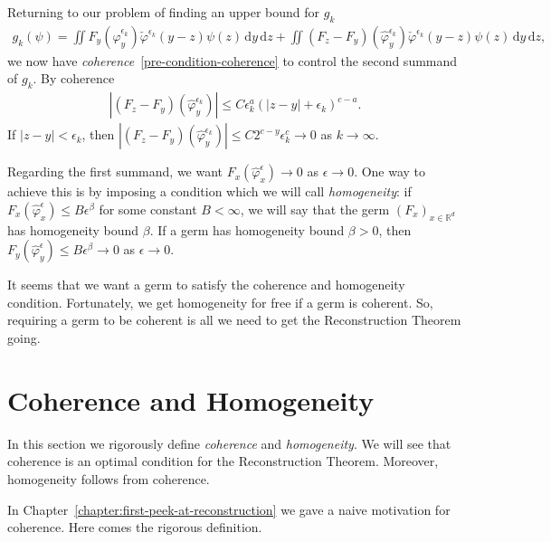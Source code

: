 Returning to our problem of finding an upper bound for \(g_k\)
\begin{align*}
    g_k(\psi) = \iint F_y(\hat \varphi^{\epsilon_k}_y) \check \varphi^{\epsilon_k}(y-z) \psi(z) \, \mathrm{d}y\, \mathrm{d}z 
    + \iint (F_z - F_y)(\hat \varphi^{\epsilon_k}_y) \check \varphi^{\epsilon_k}(y-z) \psi(z) \, \mathrm{d}y\, \mathrm{d}z,
\end{align*}
we now have \emph{coherence}~\eqref{pre-condition-coherence} to control the second summand of \(g_k\). By coherence 
\begin{align*}
    |(F_z - F_y)(\hat \varphi^{\epsilon_k}_y)| \leq C \epsilon_k^{a} {(|z-y| + \epsilon_k)}^{c-a}.
\end{align*}
If \(|z-y| < \epsilon_k\), then \(|(F_z - F_y)(\hat \varphi^{\epsilon_k}_y)| \leq C2^{c-y} \epsilon_k^c \to 0\) as \(k \to \infty\).

Regarding the first summand, we want \(F_x(\hat \varphi^{\epsilon}_x) \to 0\) as \(\epsilon \to 0\). One way to achieve this is by imposing a condition which we will call \emph{homogeneity}: if \(F_x(\hat \varphi^{\epsilon}_x) \leq B \epsilon^{\beta}\) for some constant \(B < \infty\), we will say that the germ \({(F_x)}_{x \in \mathbb{R}^d}\) has homogeneity bound \(\beta\). If a germ has homogeneity bound \(\beta > 0\), then   \(F_y(\hat \varphi^{\epsilon}_y) \leq B \epsilon^\beta \to 0\) as \(\epsilon \to 0\).  

It seems that we want a germ to satisfy the coherence and homogeneity condition. Fortunately, we get homogeneity for free if a germ is coherent. So, requiring a germ to be coherent is all we need to get the Reconstruction Theorem going.

\section{Coherence and Homogeneity}\label{chapter:coherence}

In this section we rigorously define \emph{coherence} and \emph{homogeneity}. We will see that coherence is an optimal condition for the Reconstruction Theorem. Moreover, homogeneity follows from coherence.

In Chapter~\ref{chapter:first-peek-at-reconstruction} we gave a naive motivation for coherence. Here comes the rigorous definition.

